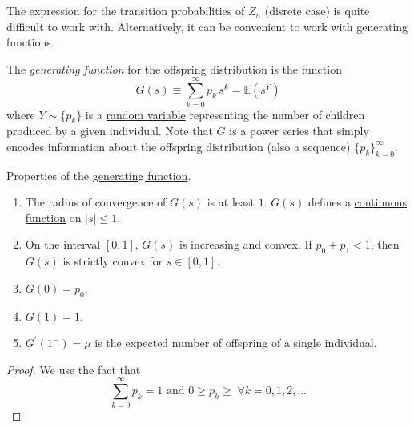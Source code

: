     The expression for the transition probabilities of $Z_n$ (disrete case) is quite difficult to work with. Alternatively, it can be convenient to work with generating functions. 

    \begin{definition}
      \label{def:generating-function}
      The \textit{generating function} for the offspring distribution is the function 
      \begin{equation}
        G(s) \equiv \sum_{k=0}^\infty p_k \, s^k = \mathbb{E}(s^Y)
      \end{equation}
      where $Y \sim \{p_k\}$ is a \hyperref[def:random-variable]{random variable} representing the number of children produced by a given individual. Note that $G$ is a power series that simply encodes information about the offspring distribution (also a sequence) $\{p_k\}_{k=0}^\infty$. 
    \end{definition}

    \begin{theorem}[Properties]
      \label{thm:properties}
      Properties of the \hyperref[def:generating-function]{generating function}. 
      \begin{enumerate}
        \item The radius of convergence of $G(s)$ is at least $1$. $G(s)$ defines a \hyperref[pst-def:continuous_func]{continuous function} on $|s| \leq 1$. 
        \item On the interval $[0,1]$, $G(s)$ is increasing and convex. If $p_0 + p_1 < 1$, then $G(s)$ is strictly convex for $s \in [0,1]$. 
        \item $G(0) = p_0$. 
        \item $G(1) = 1$. 
        \item $G^\prime(1^-) = \mu$ is the expected number of offspring of a single individual. 
      \end{enumerate}
    \end{theorem}
    \begin{proof}
      We use the fact that 
      \begin{equation}
        \sum_{k=0}^\infty p_k = 1 \text{ and } 0 \geq p_k \geq \; \forall k = 0, 1, 2, ...
      \end{equation}
    \end{proof}

